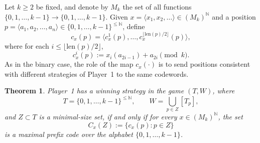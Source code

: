 \documentclass[a4,12pt]{article}%
\newtheorem{theorem}{Theorem}[section]
\begin{document}
Let $k \geq 2$ be fixed, and denote by $M_k$ the set of all functions
$\{0,1,\dots,k-1\} \to \{0,1,\dots,k-1\}$. Given
$x=\langle x_1,x_2,\dots\rangle \in (M_k)^{\mathbb{N}}$ and a position
$p=\langle a_1,a_2,\dots,a_n\rangle \in \{0,1,\dots,k-1\}^{\leq \mathbb{N}}$,
define
\[
c_x(p)
=
\langle c_x^1(p),\dots,c_x^{\lfloor \mathrm{len}(p)/2 \rfloor}(p) \rangle,
\]
where for each $i \leq \lfloor \mathrm{len}(p)/2 \rfloor$,
\[
c_x^i(p) := x_i(a_{2i-1}) + a_{2i} \pmod{k}.
\]
As in the binary case, the role of the map $c_x(\cdot)$ is to send
positions consistent with different strategies of Player~1 to the same codewords.
\begin{theorem}
\label{theorem: max prefix equivalent finite alphabet}
Player~1 has a winning strategy in the game $(T,W)$, where
\[
T = \{0,1,\dots,k-1\}^{\leq \mathbb{N}}, \qquad
W = \bigcup_{p \in Z} [T_p],
\]
and $Z \subset T$ is a minimal-size set, if and only if for every
$x \in (M_k)^{\mathbb{N}}$, the set
\[
C_x(Z) := \{ c_x(p) : p \in Z \}
\]
is a maximal prefix code over the alphabet $\{0,1,\dots,k-1\}$.
\end{theorem}
\end{document}

